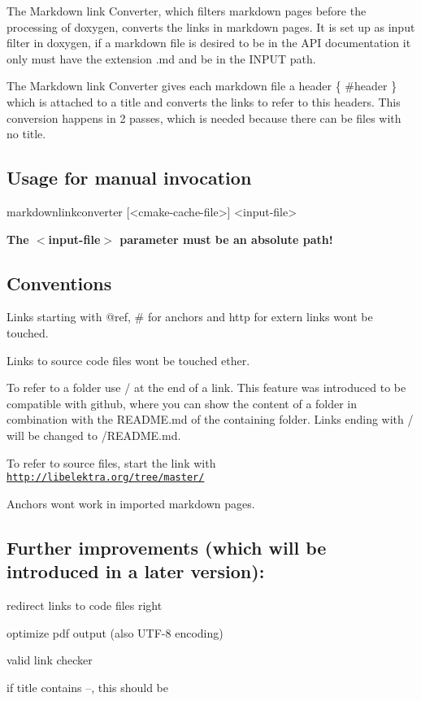 The Markdown link Converter, which filters markdown pages before the processing of doxygen, converts the links in markdown pages. It is set up as input filter in doxygen, if a markdown file is desired to be in the A\+P\+I documentation it only must have the extension {\ttfamily .md} and be in the {\ttfamily I\+N\+P\+U\+T} path.

The Markdown link Converter gives each markdown file a header {\ttfamily \{ \#header \}} which is attached to a title and converts the links to refer to this headers. This conversion happens in 2 passes, which is needed because there can be files with no title.

\subsection*{Usage for manual invocation}

\begin{DoxyVerb}    markdownlinkconverter [<cmake-cache-file>] <input-file>
\end{DoxyVerb}


{\bfseries The $<$input-\/file$>$ parameter must be an absolute path!}

\subsection*{Conventions}


\begin{DoxyItemize}
\item Links starting with {\ttfamily @ref}, {\ttfamily \#} for anchors and {\ttfamily http} for extern links wont be touched.
\item Links to source code files wont be touched ether.
\item To refer to a folder use {\ttfamily /} at the end of a link. This feature was introduced to be compatible with github, where you can show the content of a folder in combination with the R\+E\+A\+D\+M\+E.\+md of the containing folder. Links ending with {\ttfamily /} will be changed to {\ttfamily /\+R\+E\+A\+D\+M\+E.md}.
\item To refer to source files, start the link with \href{http://libelektra.org/tree/master/}{\tt http\+://libelektra.\+org/tree/master/}
\item Anchors wont work in imported markdown pages.
\end{DoxyItemize}

\subsection*{Further improvements (which will be introduced in a later version)\+:}


\begin{DoxyItemize}
\item redirect links to code files right
\item optimize pdf output (also U\+T\+F-\/8 encoding)
\item valid link checker
\item if title contains --, this should be 
\end{DoxyItemize}